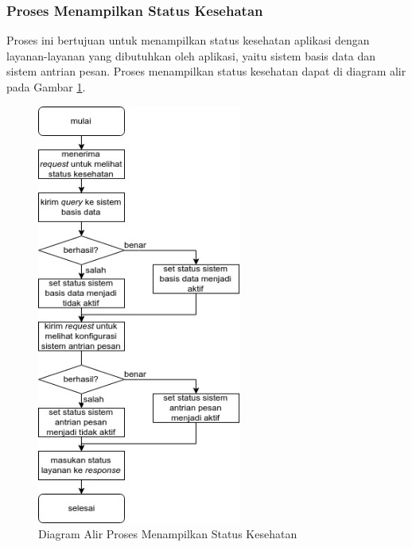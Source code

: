 \subsubsection{Proses Menampilkan Status Kesehatan}
\par Proses ini bertujuan untuk menampilkan status kesehatan aplikasi dengan layanan-layanan yang dibutuhkan oleh aplikasi, yaitu sistem basis data dan sistem antrian pesan. Proses menampilkan status kesehatan dapat di diagram alir pada Gambar \ref{fc:kesehatan}.
\begin{figure}[hb]
	\centering\includegraphics[width=0.6\textwidth]{bab3/flowchart/flowchart-menampilkan_kesehatan.jpg}
	\caption{Diagram Alir Proses Menampilkan Status Kesehatan} \label{fc:kesehatan}
\end{figure}

